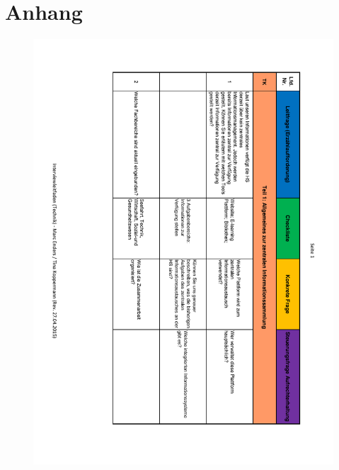 \chapter*{Anhang}\setcounter{chapter}{1}


\begin{figure}
	\centering
	\includegraphics[width=18cm]{kapitel/anhang/Interviewleitfaden_1}
\end{figure}

